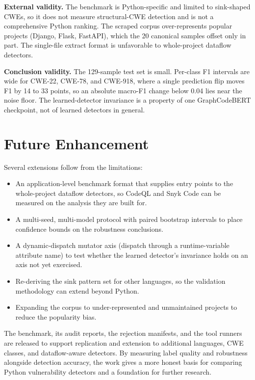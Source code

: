 \textbf{External validity.} The benchmark is Python-specific and limited to
sink-shaped CWEs, so it does not measure structural-CWE detection and is not a
comprehensive Python ranking. The scraped corpus over-represents popular
projects (Django, Flask, FastAPI), which the 20 canonical samples offset only in
part. The single-file extract format is unfavorable to whole-project dataflow
detectors.

\textbf{Conclusion validity.} The 129-sample test set is small. Per-class F1
intervals are wide for CWE-22, CWE-78, and CWE-918, where a single prediction
flip moves F1 by 14 to 33 points, so an absolute macro-F1 change below 0.04 lies
near the noise floor. The learned-detector invariance is a property of one
GraphCodeBERT checkpoint, not of learned detectors in general.


\section{Future Enhancement}

Several extensions follow from the limitations:

\begin{itemize}
  \item An application-level benchmark format that supplies entry points to the
    whole-project dataflow detectors, so CodeQL and Snyk Code can be measured on
    the analysis they are built for.
  \item A multi-seed, multi-model protocol with paired bootstrap intervals to
    place confidence bounds on the robustness conclusions.
  \item A dynamic-dispatch mutator axis (dispatch through a runtime-variable
    attribute name) to test whether the learned detector's invariance holds on
    an axis not yet exercised.
  \item Re-deriving the sink pattern set for other languages, so the validation
    methodology can extend beyond Python.
  \item Expanding the corpus to under-represented and unmaintained projects to
    reduce the popularity bias.
\end{itemize}


\vspace{1cm}

The benchmark, its audit reports, the rejection manifests, and the tool runners
are released to support replication and extension to additional languages, CWE
classes, and dataflow-aware detectors. By measuring label quality and
robustness alongside detection accuracy, the work gives a more honest basis for
comparing Python vulnerability detectors and a foundation for further research.
